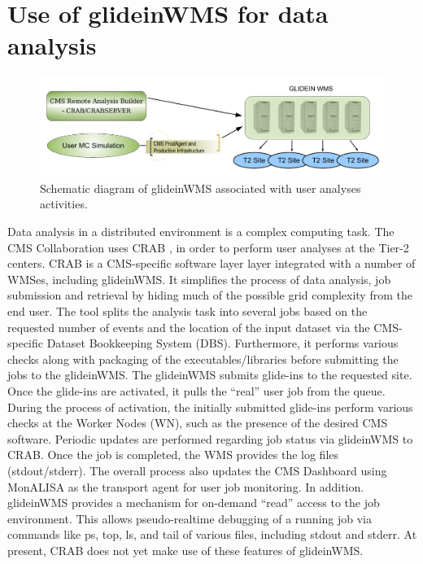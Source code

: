 \documentclass[a4paper]{jpconf}
\begin{document}
\section{Use of glideinWMS for data analysis}
\begin{figure}
\begin{center}
\includegraphics[scale=0.4]{user_analysis}
\end{center}
\caption{Schematic diagram of glideinWMS associated with user analyses activities.}
\label{fig:user_analysis}
\end{figure}
Data analysis in a distributed environment is a complex computing task. The CMS Collaboration
uses CRAB \cite{bib:cms_crab}, in order to perform user analyses at the Tier-2 centers.
CRAB is a CMS-specific software layer layer integrated with a number of WMSes, including glideinWMS.
It simplifies the process of data analysis, job submission and retrieval by hiding much of the possible grid complexity from the
end user. The tool splits the analysis task into several jobs based on the requested number of events and
the location of the input dataset via the CMS-specific Dataset Bookkeeping System (DBS). Furthermore, it performs various checks along with 
packaging of the executables/libraries before submitting the jobs to the glideinWMS. 
The glideinWMS submits glide-ins to the requested site.  Once the glide-ins are activated, it pulls the ``real'' user job from the queue.
During the process of activation, the initially submitted glide-ins perform various checks at the Worker Nodes (WN), such as the presence of the desired 
CMS software. Periodic updates are performed regarding job status via glideinWMS to CRAB. Once the job is completed, the WMS provides the 
log files (stdout/stderr). The overall process also updates the CMS Dashboard using MonALISA as the transport agent for user job monitoring.
In addition. glideinWMS provides a mechanism for on-demand ``read'' access to the job environment. This allows
pseudo-realtime debugging of a running job via commands like ps, top, ls, and tail of various files, including stdout and stderr. 
At present, CRAB does not yet make use of these features of glideinWMS.
\end{document}
